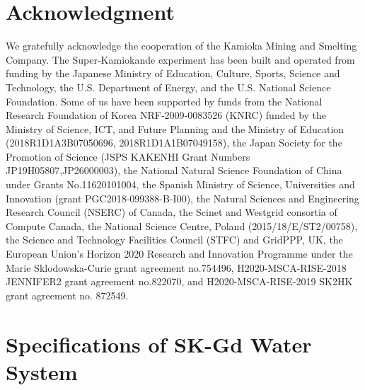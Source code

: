 \documentclass[preprint,12pt]{elsarticle}
\begin{document}
\section*{Acknowledgment}
We gratefully acknowledge the cooperation of the Kamioka Mining and Smelting Company.
The Super‐Kamiokande experiment has been built and operated from funding by the 
Japanese Ministry of Education, Culture, Sports, Science and Technology, the U.S.
Department of Energy, and the U.S. National Science Foundation. Some of us have been 
supported by funds from the National Research Foundation of Korea NRF‐2009‐0083526
(KNRC) funded by the Ministry of Science, ICT, and Future Planning and the Ministry of
Education (2018R1D1A3B07050696, 2018R1D1A1B07049158), 
the Japan Society for the Promotion of Science (JSPS KAKENHI Grant Numbers JP19H05807,JP26000003), the National
Natural Science Foundation of China under Grants No.11620101004, the Spanish Ministry of Science, 
Universities and Innovation (grant PGC2018-099388-B-I00), the Natural Sciences and 
Engineering Research Council (NSERC) of Canada, the Scinet and Westgrid consortia of
Compute Canada, the National Science Centre, Poland (2015/18/E/ST2/00758),
the Science and Technology Facilities Council (STFC) and GridPPP, UK, the European Union's 
Horizon 2020 Research and Innovation Programme under the Marie Sklodowska-Curie grant
agreement no.754496, H2020-MSCA-RISE-2018 JENNIFER2 grant agreement no.822070, and 
H2020-MSCA-RISE-2019 SK2HK grant agreement no. 872549.

\clearpage
\appendix
\section{Specifications of SK-Gd Water System}
\label{Append:1}
\end{document}
